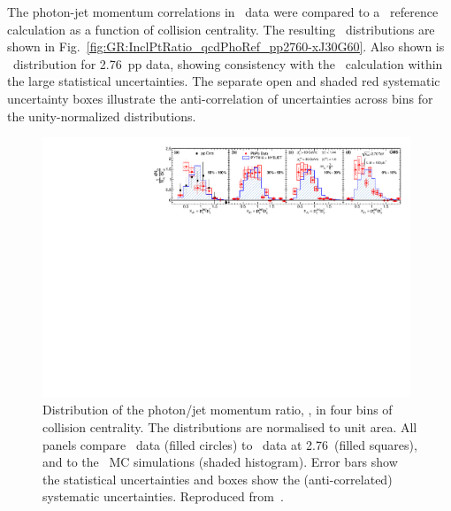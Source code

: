 The photon-jet momentum correlations in \PbPb\ data were compared to a \PYTHYD\ reference 
calculation as a function of collision centrality. The resulting 
\xjg\ distributions are shown in Fig.~\ref{fig:GR:InclPtRatio_qcdPhoRef_pp2760-xJ30G60}.
Also shown is \avexjg\ distribution for 2.76\TeV\ pp data, showing consistency 
with the \PYTHYD\ calculation within the large statistical uncertainties.
The separate open and shaded red systematic uncertainty boxes illustrate the 
anti-correlation of uncertainties across bins for the unity-normalized distributions.

\begin{figure}[!h]
\begin{center}
\includegraphics[width=0.98\textwidth]{jetfigures/Photonv7_Paper_InclPtRatio_all_cent4_G60J30_subDPhi1SS1_Isol0_Norm1log1.pdf}
\caption[]{\label{fig:GR:InclPtRatio_qcdPhoRef_pp2760-xJ30G60} Distribution of the photon/jet 
momentum ratio, \xjg, in four bins of collision centrality. 
  The distributions are normalised to unit area. All panels compare
\PbPb\ data (filled circles) to \pp\ data at
  2.76\TeV\ (filled squares), and to the \PYTHYD\ MC simulations
  (shaded histogram). Error bars show the statistical uncertainties and
boxes show the (anti-correlated) systematic uncertainties. Reproduced from~\cite{Chatrchyan:2012gt}.}
\label{fig:GR:CMS_xjg}
\end{center}
\end{figure}

